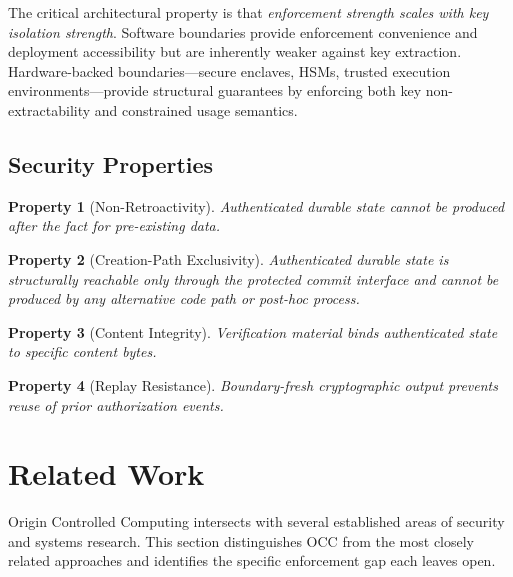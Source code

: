 \documentclass[11pt,letterpaper]{article}
\theoremstyle{occplain}
\theoremstyle{occremark}
\newtheorem{property}{Property}[section]
\begin{document}
The critical architectural property is that \emph{enforcement strength scales with key isolation strength}. Software boundaries provide enforcement convenience and deployment accessibility but are inherently weaker against key extraction. Hardware-backed boundaries---secure enclaves, HSMs, trusted execution environments---provide structural guarantees by enforcing both key non-extractability and constrained usage semantics.


\subsection{Security Properties}
\label{sec:security-properties}

\begin{property}[Non-Retroactivity]
\label{prop:non-retroactivity-arch}
Authenticated durable state cannot be produced after the fact for pre-existing data.
\end{property}

\begin{property}[Creation-Path Exclusivity]
\label{prop:creation-path}
Authenticated durable state is structurally reachable only through the protected commit interface and cannot be produced by any alternative code path or post-hoc process.
\end{property}

\begin{property}[Content Integrity]
\label{prop:content-integrity}
Verification material binds authenticated state to specific content bytes.
\end{property}

\begin{property}[Replay Resistance]
\label{prop:replay-resistance}
Boundary-fresh cryptographic output prevents reuse of prior authorization events.
\end{property}


\section{Related Work}
\label{sec:related}

Origin Controlled Computing intersects with several established areas of security and systems research. This section distinguishes OCC from the most closely related approaches and identifies the specific enforcement gap each leaves open.
\end{document}
